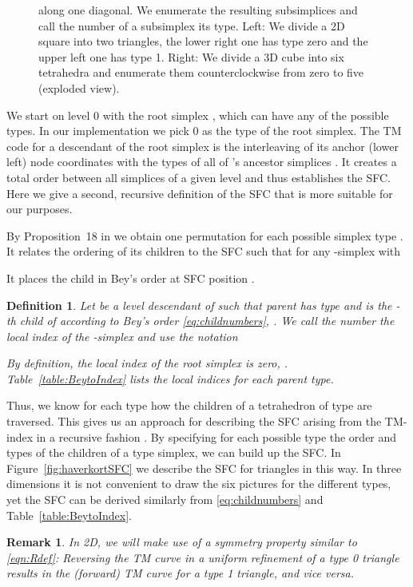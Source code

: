 \documentclass[a4paper,11pt]{article}
\newcommand{\eqnref}[1]{\eqref{eqn:#1}}
\newtheorem{dfn}[thm]{Definition}
\newtheorem{rem}[thm]{Remark}
\begin{document}
\begin{figure}
{         along one diagonal. We enumerate the resulting subsimplices and call
         the number of a subsimplex its type.
         Left: We divide a 2D square into two triangles, the lower right one
               has type zero and the upper left one has type 1.
         Right: We divide a 3D cube into six tetrahedra and enumerate them
               counterclockwise from zero to five (exploded view).}
\label{fig:typeofsimplex}
\end{figure}

We start on level 0 with the root simplex , which can have any of the
possible types.
In our implementation we pick 0 as the type of the root simplex.
The TM code  for a descendant  of the root simplex is the interleaving
of its anchor (lower left) node coordinates with the types of all of 's
ancestor simplices \cite{BursteddeHolke16}.
It creates a total order between all simplices of a given level and thus
establishes the SFC.
Here we give a second, recursive definition of the SFC that is more suitable
for our purposes.

By Proposition~18 in \cite{BursteddeHolke16} we obtain one permutation
 for each possible simplex type .
It relates the ordering of
its
children to the SFC
such
that for any -simplex  with 

It places the child  in Bey's
order at SFC position .
\begin{dfn}
 \label{def:localindex}
 Let  be a level  descendant of  such that  parent  has
 type  and  is the -th child of  according to Bey's order
 \eqref{eq:childnumbers},
  . We call the number  the \emph{local index} of
 the -simplex  and use the notation
 
 By definition, the local index of the root simplex is zero, .
 Table~\ref{table:BeytoIndex} lists the local indices for each parent type.
\end{dfn}
Thus, we know for each type  how the children of a tetrahedron of type  are traversed.
This gives us an approach for describing the SFC arising from the TM-index in a recursive fashion \cite{HaverkortWalderveen10}.
By specifying for each possible type  the order and types of the children of a type  simplex, we can build up the SFC.
In Figure~\ref{fig:haverkortSFC} we describe the SFC for triangles in this way.
In three dimensions it is not convenient to draw the six pictures for the
different types, yet
the SFC can be derived similarly from \eqref{eq:childnumbers} and Table~\ref{table:BeytoIndex}.

\begin{rem}
\label{rem:simplexsym}
  In 2D, we will make use of a symmetry property similar to \eqnref{Rdef}:
  Reversing the TM curve in a uniform refinement of a type 0 triangle
  results in the (forward) TM curve for a type 1 triangle, and vice versa.
\end{rem}
\end{document}
